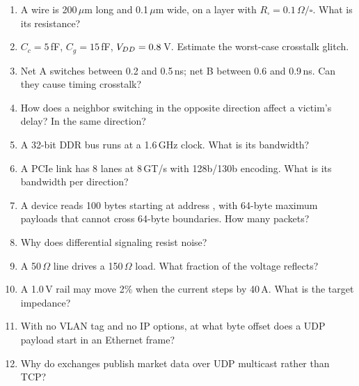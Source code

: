 \begin{enumerate}
  \item A wire is 200\,$\mu$m long and 0.1\,$\mu$m wide, on a layer with $R_\square = 0.1\,\Omega/\square$. What is its resistance?
  \item $C_c = 5$\,fF, $C_g = 15$\,fF, $V_{DD} = 0.8$\,V. Estimate the worst-case crosstalk glitch.
  \item Net A switches between 0.2 and 0.5\,ns; net B between 0.6 and 0.9\,ns. Can they cause timing crosstalk?
  \item How does a neighbor switching in the opposite direction affect a victim's delay? In the same direction?
  \item A 32-bit DDR bus runs at a 1.6\,GHz clock. What is its bandwidth?
  \item A PCIe link has 8 lanes at 8\,GT/s with 128b/130b encoding. What is its bandwidth per direction?
  \item A device reads 100 bytes starting at address , with 64-byte maximum payloads that cannot cross 64-byte boundaries. How many packets?
  \item Why does differential signaling resist noise?
  \item A 50\,$\Omega$ line drives a 150\,$\Omega$ load. What fraction of the voltage reflects?
  \item A 1.0\,V rail may move 2\% when the current steps by 40\,A. What is the target impedance?
  \item With no VLAN tag and no IP options, at what byte offset does a UDP payload start in an Ethernet frame?
  \item Why do exchanges publish market data over UDP multicast rather than TCP?
\end{enumerate}

